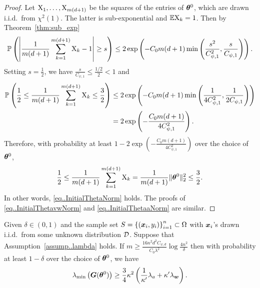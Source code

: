 \documentclass{article}
\begin{document}
\begin{proof}
    Let $\textnormal{X}_1, \ldots, \textnormal{X}_{m(d+1)}$ be the squares of the entries of $\bm{\theta}^0$, which are drawn i.i.d.\ from $\chi^2(1)$. The latter is sub-exponential and $\mathbb{E}\textnormal{X}_k=1$. Then by Theorem~\ref{thm:sub_exp}
              \begin{equation*}
                  \mathbb{P}\left(\left\lvert\frac{1}{m(d+1)}\sum_{k=1}^{m(d+1)}\textnormal{X}_k-1\right\rvert\geq s\right)\leq 2\exp\left(-C_0 m(d+1) \min\left(\frac{s^2}{C^2_{\psi,1}},\frac{s}{C_{\psi,1}}\right)\right).
              \end{equation*}
              Setting $s=\frac{1}{2}$, we have $\frac{s}{C_{\psi,1}}\leq \frac{1/2}{2}< 1$ and
              \begin{equation*}
                  \begin{aligned}
                      \mathbb{P}\left(\frac{1}{2}\leq\frac{1}{m(d+1)}\sum_{k=1}^{m(d+1)}\textnormal{X}_k\leq\frac{3}{2}\right)
                       & \leq 2\exp\left(-C_0 m(d+1) \min\left(\frac{1}{4C^2_{\psi,1}},\frac{1}{2C_{\psi,1}}\right)\right) \\
                       & =2\exp\left(-\frac{C_0m(d+1)}{4C^2_{\psi,1}}\right).
                  \end{aligned}
              \end{equation*}
              Therefore, with probability at least $1-2\exp\left(-\frac{C_0m(d+1)}{4C^2_{\psi,1}}\right)$ over the choice of $\bm{\theta}^0$,
              \begin{equation*}
                  \frac{1}{2}\leq\frac{1}{m(d+1)}\sum_{k=1}^{m(d+1)}\textnormal{X}_k=\frac{1}{m(d+1)}\lVert\bm{\theta}^0\rVert_2^2\leq\frac{3}{2}.
              \end{equation*}
              In other words, \eqref{eq..InitialThetaNorm} holds. The proofs of \eqref{eq..InitialThetavwNorm} and \eqref{eq..InitialThetaaNorm} are similar.
\end{proof}
\begin{lem}\label{lem:lambda_min}
    Given $\delta\in(0,1)$ and the sample set $S = {\{(\bm{x}_i, y_i)\}}_{i=1}^n\subset\Omega$ with $\bm{x}_i$'s drawn i.i.d.\ from some unknown distribution $\mathcal{D}$. Suppose that Assumption~\ref{assump..lambda} holds. If $m\geq\frac{16n^2d^2C_{\psi,d}}{C_0\lambda^2}\log\frac{4n^2}{\delta}$ then with probability at least $1-\delta$ over the choice of $\bm{\theta}^0$, we have
    \begin{equation}
        \lambda_{\min}\left(\bm{G}(\bm{\theta}^0)\right)\geq\frac{3}{4}\kappa^2\left(\frac{1}{\kappa'}\lambda_a+\kappa'\lambda_{\bm{w}}\right).
    \end{equation}
\end{lem}
\end{document}
